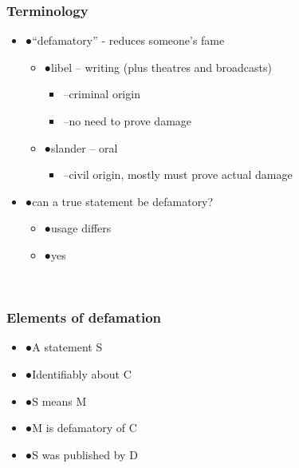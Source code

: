 \documentclass[ignorenonframetext,]{beamer}
\begin{document}
\begin{frame}
\frametitle{Terminology}

\begin{itemize}
\item  {●}``defamatory'' - reduces someone's fame

  \begin{itemize}
  \item    {●}libel -- writing (plus theatres and broadcasts)

    \begin{itemize}
    \item      {--}criminal origin
    \item      {--}no need to prove damage
    \end{itemize}
  \item    {●}slander -- oral

    \begin{itemize}
    \item      {--}civil origin, {mostly}{ must prove actual damage}
    \end{itemize}
  \end{itemize}
\item  {●}can a true statement be defamatory?

  \begin{itemize}
  \item    {●}usage differs
  \item    {●}yes
  \end{itemize}
\end{itemize}

~


\end{frame}

\begin{frame}
\frametitle{Elements of defamation}

\begin{itemize}
\item  {●}A statement S
\item  {●}Identifiably about C
\item  {●}S means M
\item  {●}M is defamatory of C
\item  {●}S was published by D
\end{itemize}

~


\end{frame}
\end{document}
